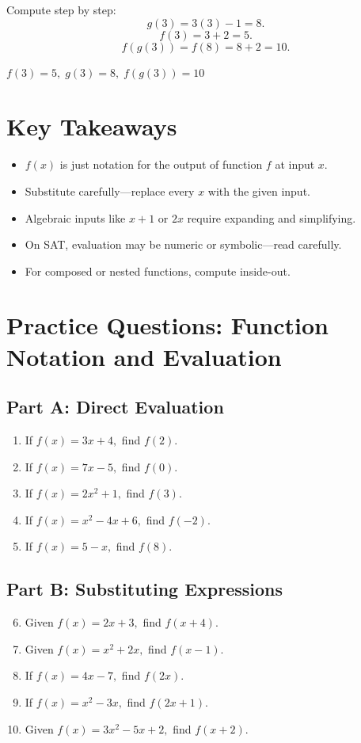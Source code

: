 \documentclass[14pt]{extarticle}
\begin{document}
Compute step by step:
\[
g(3) = 3(3) - 1 = 8.
\]
\[
f(3) = 3 + 2 = 5.
\]
\[
f(g(3)) = f(8) = 8 + 2 = 10.
\]

\(\boxed{f(3) = 5,\; g(3) = 8,\; f(g(3)) = 10}\)

\section*{Key Takeaways}
\begin{itemize}
  \item \(f(x)\) is just notation for the output of function \(f\) at input \(x\).
  \item Substitute carefully—replace every \(x\) with the given input.
  \item Algebraic inputs like \(x+1\) or \(2x\) require expanding and simplifying.
  \item On SAT, evaluation may be numeric or symbolic—read carefully.
  \item For composed or nested functions, compute inside-out.
\end{itemize}

\newpage


\section*{Practice Questions: Function Notation and Evaluation}

\subsection*{Part A: Direct Evaluation}
\begin{enumerate}
  \item If \(f(x) = 3x + 4,\) find \(f(2).\)
  \item If \(f(x) = 7x - 5,\) find \(f(0).\)
  \item If \(f(x) = 2x^2 + 1,\) find \(f(3).\)
  \item If \(f(x) = x^2 - 4x + 6,\) find \(f(-2).\)
  \item If \(f(x) = 5 - x,\) find \(f(8).\)
\end{enumerate}

\subsection*{Part B: Substituting Expressions}
\begin{enumerate}
  \setcounter{enumi}{5}
  \item Given \(f(x) = 2x + 3,\) find \(f(x + 4).\)
  \item Given \(f(x) = x^2 + 2x,\) find \(f(x - 1).\)
  \item If \(f(x) = 4x - 7,\) find \(f(2x).\)
  \item If \(f(x) = x^2 - 3x,\) find \(f(2x + 1).\)
  \item Given \(f(x) = 3x^2 - 5x + 2,\) find \(f(x + 2).\)
\end{enumerate}
\end{document}
